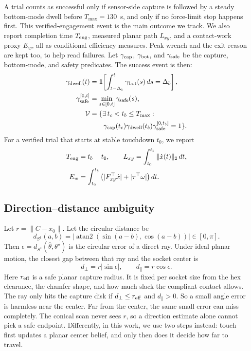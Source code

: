 \documentclass[letterpaper,10 pt,conference]{ieeeconf}
\newcommand{\ind}{\mathbf{1}}
\newcommand{\dS}{d_{S^1}}
\begin{document}
A trial counts as successful only if sensor-side capture is followed by a
steady bottom-mode dwell before $T_{\max}=130$~s, and only if no
force-limit stop happens first.  This verified-engagement event is the main
outcome we track.  We also report completion time $T_{\rm eng}$, measured
planar path $L_{xy}$, and a contact-work proxy $E_w$, all as conditional
efficiency measures.  Peak wrench and the exit reason are kept too, to help
read failures.  Let $\gamma_{\rm cap}$, $\gamma_{\rm bot}$, and
$\gamma_{\rm safe}$ be the capture, bottom-mode, and safety predicates.
The success event is then:
\begin{equation}
\begin{aligned}
\gamma_{\rm dwell}(t)&=\ind\!\left[
\int_{t-\Delta_b}^{t}\gamma_{\rm bot}(s)\,ds=\Delta_b\right],\\
\gamma_{\rm safe}^{[0,t]}&=\min_{s\in[0,t]}\gamma_{\rm safe}(s),\\
\mathcal V&=\{\exists\,t_c<t_b\le T_{\max}:\\
&\qquad\gamma_{\rm cap}(t_c)\gamma_{\rm dwell}(t_b)
\gamma_{\rm safe}^{[0,t_b]}=1\}.
\end{aligned}
\label{eq:verified_event}
\end{equation}
For a verified trial that starts at stable touchdown $t_0$, we report
\begin{align}
T_{\rm eng}&=t_b-t_0,\qquad
L_{xy}=\int_{t_0}^{t_b}\|\dot x(t)\|_2\,dt,
\nonumber\\
E_w&=\int_{t_0}^{t_b}\left(
|F_{xy}^{\top}\dot x|+|\tau^{\top}\omega|\right)dt .
\label{eq:hardware_metrics}
\end{align}

\subsection{Direction--distance ambiguity}

Let $r=\|C-x_0\|$.  Let the circular distance be
\begin{equation}
\dS(a,b)=\left|\operatorname{atan2}\!\left(\sin(a-b),\cos(a-b)\right)\right|\in[0,\pi].
\label{eq:circular_distance}
\end{equation}
Then $\epsilon=\dS(\hat\theta,\theta^\star)$ is the circular error of a
direct ray.  Under ideal planar motion, the closest gap between that ray
and the socket center is
\begin{equation}
d_\perp=r|\sin\epsilon|,\qquad
d_\parallel=r\cos\epsilon .
\label{eq:direct_miss}
\end{equation}
Here $r_{\rm eff}$ is a safe planar capture radius.  It is fixed per socket
size from the hex clearance, the chamfer shape, and how much slack the
compliant contact allows.  The ray only hits the capture disk if
$d_\perp\le r_{\rm eff}$ and $d_\parallel>0$.  So a small angle error is
harmless near the center.  Far from the center, the same small error can
miss completely.  The conical scan never sees $r$, so a direction estimate
alone cannot pick a safe endpoint.  Differently, in this work, we use two
steps instead: touch first updates a planar center belief, and only then
does it decide how far to travel.
\end{document}
